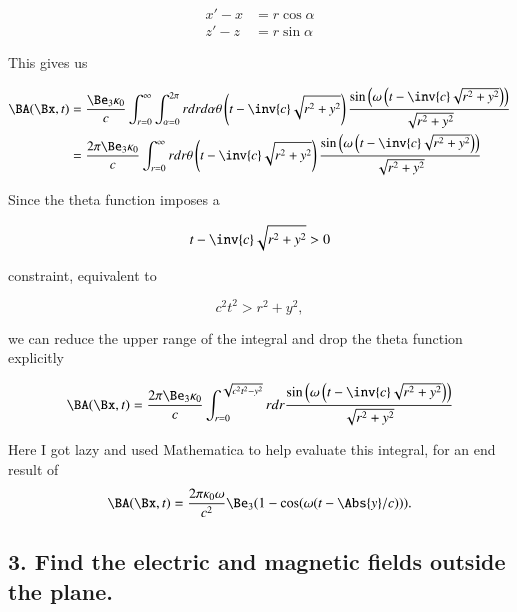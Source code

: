 \begin{align}\label{eqn:relElectroDynProblemSet5P1:90}
x' - x &= r \cos\alpha \\
z' - z &= r \sin\alpha 
\end{align}

This gives us

\begin{align*}
\BA(\Bx, t) 
&= \frac{
\Be_3 \kappa_0
}{c} \int_{r=0}^\infty \int_{\alpha=0}^{2\pi} r dr d\alpha
\theta\left(t - \inv{c} \sqrt{r^2 + y^2}\right) 
\frac{\sin\left(\omega\left(t - \inv{c} \sqrt{r^2 + y^2 }\right)\right)}{\sqrt{r^2 + y^2}} \\
&= \frac{
2 \pi \Be_3 \kappa_0
}{c} \int_{r=0}^\infty r dr 
\theta\left(t - \inv{c} \sqrt{r^2 + y^2}\right) 
\frac{\sin\left(\omega\left(t - \inv{c} \sqrt{r^2 + y^2 }\right)\right)}{\sqrt{r^2 + y^2}} \\
\end{align*}

Since the theta function imposes a 

\begin{equation}\label{eqn:relElectroDynProblemSet5P1:110}
t - \inv{c} \sqrt{r^2 + y^2 } > 0
\end{equation}

constraint, equivalent to

\begin{equation}\label{eqn:relElectroDynProblemSet5P1:130}
c^2 t^2 > r^2 + y^2,
\end{equation}

we can reduce the upper range of the integral and drop the theta function explicitly

\begin{equation}\label{eqn:relElectroDynProblemSet5P1:150}
\BA(\Bx, t) 
= \frac{
2 \pi \Be_3 \kappa_0
}{c} \int_{r=0}^{\sqrt{c^2 t^2 - y^2}} r dr 
\frac{\sin\left(\omega\left(t - \inv{c} \sqrt{r^2 + y^2 }\right)\right)}{\sqrt{r^2 + y^2}} 
\end{equation}

Here I got lazy and used Mathematica to help evaluate this integral, for an end result of
\begin{equation}\label{eqn:relElectroDynProblemSet5P1:170}
\BA(\Bx, t) 
= \frac{
2 \pi \kappa_0 \omega
}{c^2} \Be_3 (1 - \cos(\omega(t - \Abs{y}/c))).
\end{equation}

\subsection{3. Find the electric and magnetic fields outside the plane.}

